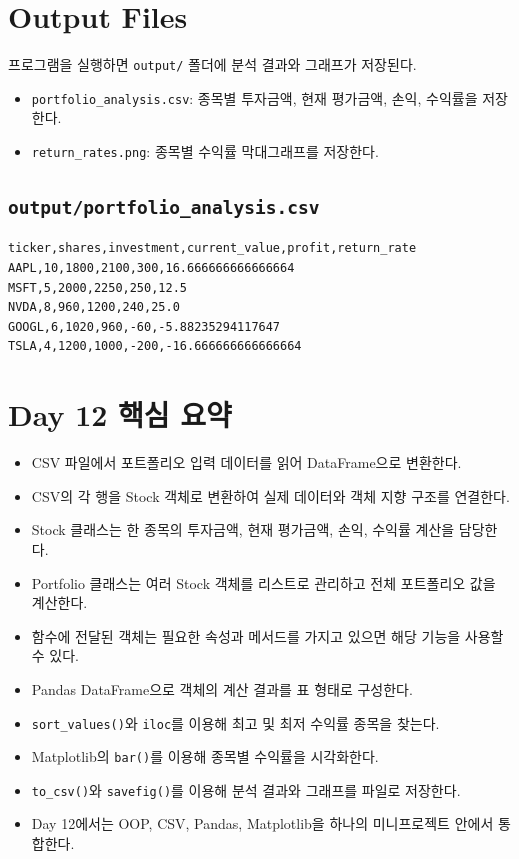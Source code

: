\documentclass[11pt,a4paper]{article}
\begin{document}
\section{Output Files}

프로그램을 실행하면 \texttt{output/} 폴더에 분석 결과와 그래프가 저장된다.

\begin{itemize}[leftmargin=1.5em]
    \item \texttt{portfolio\_analysis.csv}: 종목별 투자금액, 현재 평가금액, 손익, 수익률을 저장한다.
    \item \texttt{return\_rates.png}: 종목별 수익률 막대그래프를 저장한다.
\end{itemize}

\subsection{\texttt{output/portfolio\_analysis.csv}}

\begin{lstlisting}[language={}]
ticker,shares,investment,current_value,profit,return_rate
AAPL,10,1800,2100,300,16.666666666666664
MSFT,5,2000,2250,250,12.5
NVDA,8,960,1200,240,25.0
GOOGL,6,1020,960,-60,-5.88235294117647
TSLA,4,1200,1000,-200,-16.666666666666664
\end{lstlisting}

\section{Day 12 핵심 요약}

\begin{itemize}[leftmargin=1.5em]
    \item CSV 파일에서 포트폴리오 입력 데이터를 읽어 DataFrame으로 변환한다.
    \item CSV의 각 행을 Stock 객체로 변환하여 실제 데이터와 객체 지향 구조를 연결한다.
    \item Stock 클래스는 한 종목의 투자금액, 현재 평가금액, 손익, 수익률 계산을 담당한다.
    \item Portfolio 클래스는 여러 Stock 객체를 리스트로 관리하고 전체 포트폴리오 값을 계산한다.
    \item 함수에 전달된 객체는 필요한 속성과 메서드를 가지고 있으면 해당 기능을 사용할 수 있다.
    \item Pandas DataFrame으로 객체의 계산 결과를 표 형태로 구성한다.
    \item \texttt{sort\_values()}와 \texttt{iloc}를 이용해 최고 및 최저 수익률 종목을 찾는다.
    \item Matplotlib의 \texttt{bar()}를 이용해 종목별 수익률을 시각화한다.
    \item \texttt{to\_csv()}와 \texttt{savefig()}를 이용해 분석 결과와 그래프를 파일로 저장한다.
    \item Day 12에서는 OOP, CSV, Pandas, Matplotlib을 하나의 미니프로젝트 안에서 통합한다.
\end{itemize}
\end{document}
